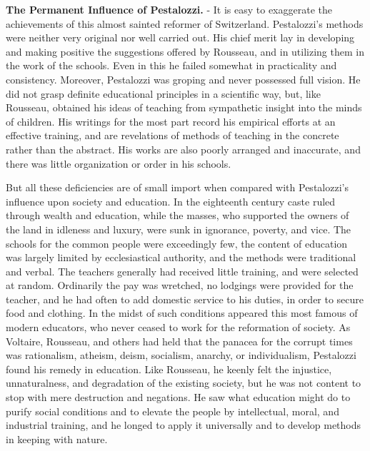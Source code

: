 \documentclass[
]{book}
\begin{document}
\textbf{The Permanent Influence of Pestalozzi.} - It is easy to exaggerate the achievements of this almost sainted reformer of Switzerland. Pestalozzi's methods were neither very original nor well carried out. His chief merit lay in developing and making positive the suggestions offered by Rousseau, and in utilizing them in the work of the schools. Even in this he failed somewhat in practicality and consistency. Moreover, Pestalozzi was groping and never possessed full vision. He did not grasp definite educational principles in a scientific way, but, like Rousseau, obtained his ideas of teaching from sympathetic insight into the minds of children. His writings for the most part record his empirical efforts at an effective training, and are revelations of methods of teaching in the concrete rather than the abstract. His works are also poorly arranged and inaccurate, and there was little organization or order in his schools.

But all these deficiencies are of small import when compared with Pestalozzi's influence upon society and education. In the eighteenth century caste ruled through wealth and education, while the masses, who supported the owners of the land in idleness and luxury, were sunk in ignorance, poverty, and vice. The schools for the common people were exceedingly few, the content of education was largely limited by ecclesiastical authority, and the methods were traditional and verbal. The teachers generally had received little training, and were selected at random. Ordinarily the pay was wretched, no lodgings were provided for the teacher, and he had often to add domestic service to his duties, in order to secure food and clothing. In the midst of such conditions appeared this most famous of modern educators, who never ceased to work for the reformation of society. As Voltaire, Rousseau, and others had held that the panacea for the corrupt times was rationalism, atheism, deism, socialism, anarchy, or individualism, Pestalozzi found his remedy in education. Like Rousseau, he keenly felt the injustice, unnaturalness, and degradation of the existing society, but he was not content to stop with mere destruction and negations. He saw what education might do to purify social conditions and to elevate the people by intellectual, moral, and industrial training, and he longed to apply it universally and to develop methods in keeping with nature.
\end{document}
